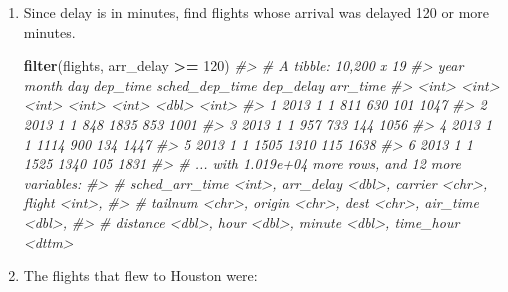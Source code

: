 \documentclass[]{book}
\newenvironment{Shaded}{\begin{snugshade}}{\end{snugshade}}
\newcommand{\CommentTok}[1]{\textcolor[rgb]{0.56,0.35,0.01}{\textit{#1}}}
\newcommand{\DecValTok}[1]{\textcolor[rgb]{0.00,0.00,0.81}{#1}}
\newcommand{\KeywordTok}[1]{\textcolor[rgb]{0.13,0.29,0.53}{\textbf{#1}}}
\newcommand{\NormalTok}[1]{#1}
\newcommand{\OperatorTok}[1]{\textcolor[rgb]{0.81,0.36,0.00}{\textbf{#1}}}
\newcommand{\StringTok}[1]{\textcolor[rgb]{0.31,0.60,0.02}{#1}}
\theoremstyle{plain}
\theoremstyle{remark}
\begin{document}
\begin{enumerate}
\def\labelenumi{\arabic{enumi}.}
\item
  Since delay is in minutes, find flights whose arrival was delayed 120
  or more minutes.

\begin{Shaded}
\begin{Highlighting}[]
\KeywordTok{filter}\NormalTok{(flights, arr_delay }\OperatorTok{>=}\StringTok{ }\DecValTok{120}\NormalTok{)}
\CommentTok{#> # A tibble: 10,200 x 19}
\CommentTok{#>    year month   day dep_time sched_dep_time dep_delay arr_time}
\CommentTok{#>   <int> <int> <int>    <int>          <int>     <dbl>    <int>}
\CommentTok{#> 1  2013     1     1      811            630       101     1047}
\CommentTok{#> 2  2013     1     1      848           1835       853     1001}
\CommentTok{#> 3  2013     1     1      957            733       144     1056}
\CommentTok{#> 4  2013     1     1     1114            900       134     1447}
\CommentTok{#> 5  2013     1     1     1505           1310       115     1638}
\CommentTok{#> 6  2013     1     1     1525           1340       105     1831}
\CommentTok{#> # ... with 1.019e+04 more rows, and 12 more variables:}
\CommentTok{#> #   sched_arr_time <int>, arr_delay <dbl>, carrier <chr>, flight <int>,}
\CommentTok{#> #   tailnum <chr>, origin <chr>, dest <chr>, air_time <dbl>,}
\CommentTok{#> #   distance <dbl>, hour <dbl>, minute <dbl>, time_hour <dttm>}
\end{Highlighting}
\end{Shaded}
\item
  The flights that flew to Houston were:


\end{enumerate}
\end{document}
